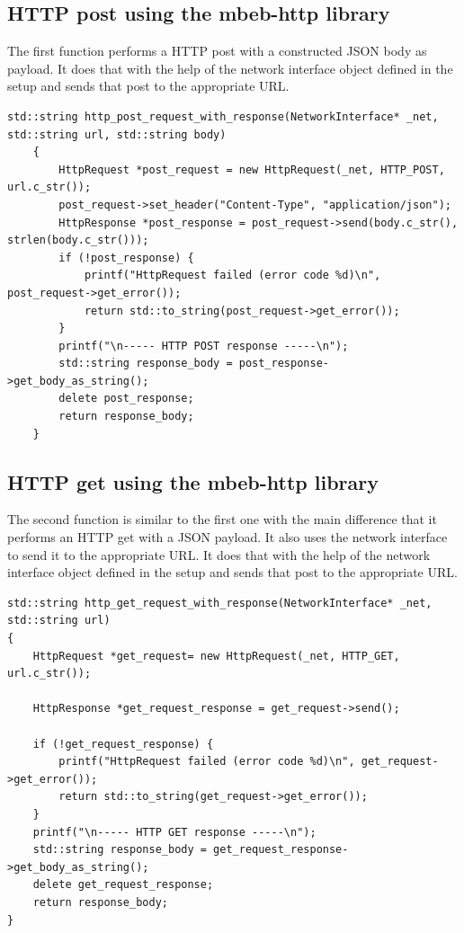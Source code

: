 \subsection{HTTP post using the mbeb-http library}
The first function performs a HTTP post with a constructed JSON body as payload.
It does that with the help of the network interface object defined in the setup and sends that post to the appropriate URL.
\begin{lstlisting}[style=CStyle]
    std::string http_post_request_with_response(NetworkInterface* _net, std::string url, std::string body)
    {
        HttpRequest *post_request = new HttpRequest(_net, HTTP_POST, url.c_str());
        post_request->set_header("Content-Type", "application/json");
        HttpResponse *post_response = post_request->send(body.c_str(), strlen(body.c_str()));
        if (!post_response) {
            printf("HttpRequest failed (error code %d)\n", post_request->get_error());
            return std::to_string(post_request->get_error());
        }
        printf("\n----- HTTP POST response -----\n");
        std::string response_body = post_response->get_body_as_string();
        delete post_response;
        return response_body;
    }
\end{lstlisting}
\subsection{HTTP get using the mbeb-http library}
The second function is similar to the first one with the main difference that it performs an HTTP get with a JSON payload.
It also uses the network interface to send it to the appropriate URL.
It does that with the help of the network interface object defined in the setup and sends that post to the appropriate URL.
\begin{lstlisting}[style=CStyle]
std::string http_get_request_with_response(NetworkInterface* _net, std::string url)
{
    HttpRequest *get_request= new HttpRequest(_net, HTTP_GET, url.c_str());

    HttpResponse *get_request_response = get_request->send();

    if (!get_request_response) {
        printf("HttpRequest failed (error code %d)\n", get_request->get_error());
        return std::to_string(get_request->get_error());
    }
    printf("\n----- HTTP GET response -----\n");
    std::string response_body = get_request_response->get_body_as_string();
    delete get_request_response;
    return response_body;
}
\end{lstlisting}
